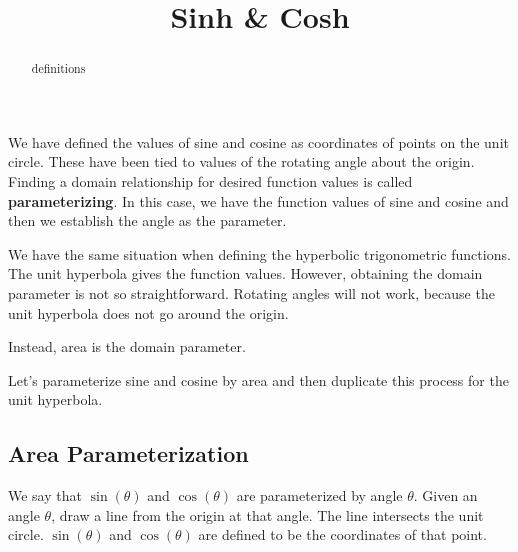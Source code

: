 \documentclass{ximera}
\title{Sinh \& Cosh}
\begin{document}
\begin{abstract}
definitions
\end{abstract}
\maketitle






We have defined the values of sine and cosine as coordinates of points on the unit circle. These have been tied to values of the rotating angle about the origin. Finding a domain relationship for desired function values is called \textbf{parameterizing}.  In this case, we have the function values of sine and cosine and then we establish the angle as the parameter.

We have the same situation when defining the hyperbolic trigonometric functions.  The unit hyperbola gives the function values. However, obtaining the domain parameter is not so straightforward.  Rotating angles will not work, because the unit hyperbola does not go around the origin.

Instead, area is the domain parameter.

Let's parameterize sine and cosine by area and then duplicate this process for the unit hyperbola.




\subsection{Area Parameterization}



We say that $\sin(\theta)$ and $\cos(\theta)$ are parameterized by angle $\theta$. Given an angle $\theta$, draw a line from the origin at that angle.  The line intersects the unit circle.  $\sin(\theta)$ and $\cos(\theta)$ are defined to be the coordinates of that point.
\end{document}
